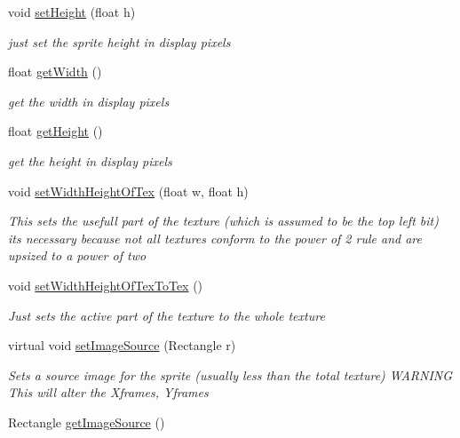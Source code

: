 \begin{DoxyCompactItemize}
void \mbox{\hyperlink{class_r_c___framework_1_1_sprite3_ad1f24cf43143791cb73c80a4af1881f0}{set\+Height}} (float h)
\begin{DoxyCompactList}\small\item\em just set the sprite height in display pixels \end{DoxyCompactList}\item 
float \mbox{\hyperlink{class_r_c___framework_1_1_sprite3_a0368a20bd12250f8f55c0788531e454a}{get\+Width}} ()
\begin{DoxyCompactList}\small\item\em get the width in display pixels \end{DoxyCompactList}\item 
float \mbox{\hyperlink{class_r_c___framework_1_1_sprite3_a67a30fb7ba96da33d63134b34e6dbc0c}{get\+Height}} ()
\begin{DoxyCompactList}\small\item\em get the height in display pixels \end{DoxyCompactList}\item 
void \mbox{\hyperlink{class_r_c___framework_1_1_sprite3_aced9c5f15e8334fd68852b3c9e67f2d8}{set\+Width\+Height\+Of\+Tex}} (float w, float h)
\begin{DoxyCompactList}\small\item\em This sets the usefull part of the texture (which is assumed to be the top left bit) its necessary because not all textures conform to the power of 2 rule and are upsized to a power of two \end{DoxyCompactList}\item 
void \mbox{\hyperlink{class_r_c___framework_1_1_sprite3_ad1f6bebc12d9d8f9bdf4ba13f3907bc3}{set\+Width\+Height\+Of\+Tex\+To\+Tex}} ()
\begin{DoxyCompactList}\small\item\em Just sets the active part of the texture to the whole texture \end{DoxyCompactList}\item 
virtual void \mbox{\hyperlink{class_r_c___framework_1_1_sprite3_ac73292a1b053056aa28ecae03165c71d}{set\+Image\+Source}} (Rectangle r)
\begin{DoxyCompactList}\small\item\em Sets a source image for the sprite (usually less than the total texture) W\+A\+R\+N\+I\+NG This will alter the Xframes, Yframes \end{DoxyCompactList}\item 
Rectangle \mbox{\hyperlink{class_r_c___framework_1_1_sprite3_a87dbfe3899e44fc7376837fe4cff0bd6}{get\+Image\+Source}} ()

\end{DoxyCompactItemize}
